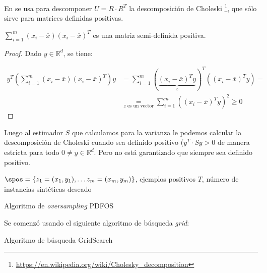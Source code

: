 En \cite{gao2014} se usa para descomponer $U = R\cdot R^T$ la descomposición de Choleski 
\footnote{\url{https://en.wikipedia.org/wiki/Cholesky_decomposition}}, que sólo sirve para matrices definidas positivas.

\begin{lemma}
 $\sum_{i=1}^m (x_i - \overline{x})(x_i - \overline{x})^T$ es una matriz semi-definida positiva.
\end{lemma}
\begin{proof}
 Dado $y \in \mathbb{R}^d$, se tiene:
 
 \begin{align*}
 y^T \left(\sum_{i=1}^m (x_i - \overline{x})(x_i - \overline{x})^T\right) y &=
 \sum_{i=1}^m ( \underbrace{(x_i - \overline{x})^T y}_z)^T ((x_i - \overline{x})^T y) = \\
 &\underset{z \textrm{ es un vector}}{=} \sum_{i=1}^m ((x_i - \overline{x})^T y)^2 \ge 0
 \end{align*}
\end{proof}

Luego al estimador $S$ que calculamos para la varianza le podemos calcular la descomposición de Choleski cuando sea 
definido positivo ($y^T \cdot S y > 0$ de manera estricta para todo $0 \neq y\in \mathbb{R}^d$. Pero no está garantizado 
que siempre sea definido positivo.

\begin{algorithm}[H]
\begin{algorithmic}[1]
  \REQUIRE $\spos = \{z_1=(x_1, y_1), \ldots z_m=(x_m, y_m)\}$, ejemplos positivos
  \REQUIRE $T$, número de instancias sintéticas deseado
  \NEWLINE
  \ENDFOR
  \NEWLINE
\end{algorithmic}
\caption{Algoritmo de \textit{oversampling} PDFOS}
\label{alg:pdfos}
\end{algorithm}


Se comenzó usando el siguiente algoritmo de búsqueda \textit{grid}:

\begin{algorithm}[H]
\begin{algorithmic}[1]
    \ENDIF
  \ENDFOR
  \RETURN{$\sigma$}
\end{algorithmic}
\caption{Algoritmo de búsqueda GridSearch}
\end{algorithm}

